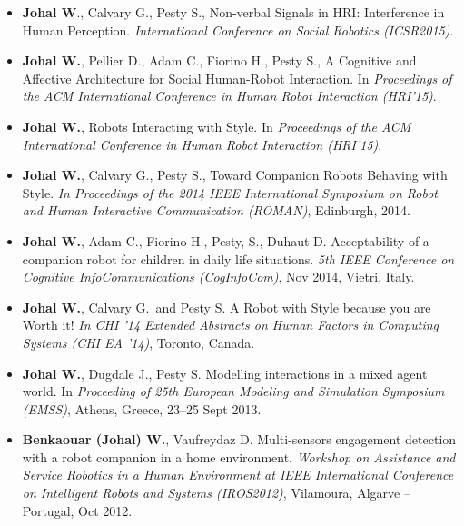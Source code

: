 \begin{itemize}[nosep]
    \item \textbf{Johal W}., Calvary G., Pesty S., Non-verbal Signals in HRI: Interference in Human Perception. \textit{International Conference on Social Robotics (ICSR2015)}.

    \item \textbf{Johal W.}, Pellier D., Adam C., Fiorino H., Pesty S., A Cognitive and Affective Architecture for Social Human-Robot Interaction. In \textit{Proceedings of the ACM International Conference in Human Robot Interaction (HRI'15)}. \faTrophy

    \item \textbf{Johal W.}, Robots Interacting with Style. In \textit{Proceedings of the ACM International Conference in Human Robot Interaction (HRI'15)}.

    \item \textbf{Johal W.}, Calvary G., Pesty S., Toward Companion Robots Behaving with Style. \textit{In Proceedings of the 2014 IEEE International Symposium on Robot and Human Interactive Communication (ROMAN)}, Edinburgh, 2014.

    \item \textbf{Johal W.}, Adam C., Fiorino H., Pesty, S., Duhaut D. Acceptability of a companion robot for children in daily life situations. \textit{5th IEEE Conference on Cognitive InfoCommunications (CogInfoCom)}, Nov 2014, Vietri, Italy.

    \item \textbf{Johal W.}, Calvary G.\ and Pesty S. A Robot with Style because you are Worth it! \textit{In CHI '14 Extended Abstracts on Human Factors in Computing Systems (CHI EA '14)}, Toronto, Canada.

    \item \textbf{Johal W.}, Dugdale J., Pesty S. Modelling interactions in a mixed agent world. In \textit{Proceeding of 25th European Modeling and Simulation Symposium (EMSS)}, Athens, Greece, 23--25 Sept 2013.

    \item \textbf{Benkaouar (Johal) W.}, Vaufreydaz D. Multi-sensors engagement detection with a robot companion in a home environment. \textit{Workshop on Assistance and Service Robotics in a Human Environment at IEEE International Conference on Intelligent Robots and Systems (IROS2012)}, Vilamoura, Algarve -- Portugal, Oct 2012.
\end{itemize}

\vspace{0.1in}


